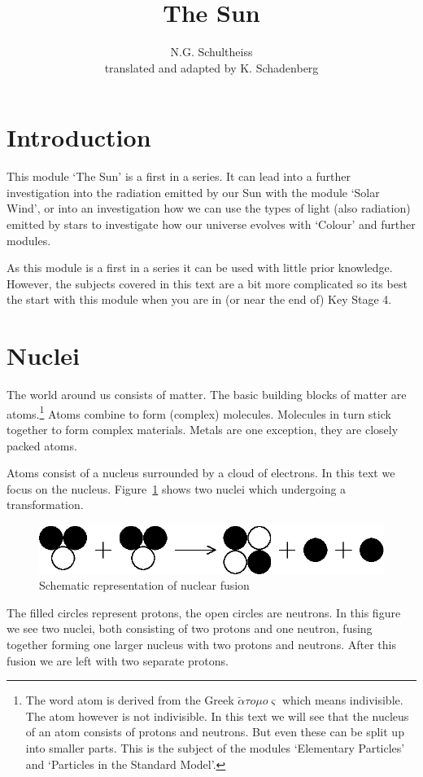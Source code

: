\documentclass[12pt,a4paper]{article}
\author{N.G. Schultheiss \\ translated and adapted by K. Schadenberg}
\date{}
\title{The Sun}
\numberwithin{equation}{section}
\numberwithin{figure}{section}
\numberwithin{table}{section}
\begin{document}
\maketitle

\section{Introduction}
This module `The Sun' is a first in a series. It can lead into a further investigation into the radiation emitted by our Sun with the module `Solar Wind', or into an investigation how we can use the types of light (also radiation) emitted by stars to investigate how our universe evolves with `Colour' and further modules.

As this module is a first in a series it can be used with little prior knowledge. However, the subjects covered in this text are a bit more complicated so its best the start with this module when you are in (or near the end of) Key Stage 4.

\section{Nuclei}
The world around us consists of matter. The basic building blocks of matter are atoms.\footnote{The word atom is derived from the Greek $\breve{\alpha}\tau o \mu o \varsigma$ which means indivisible. The atom however is not indivisible. In this text we will see that the nucleus of an atom consists of protons and neutrons. But even these can be split up into smaller parts. This is the subject of the modules `Elementary Particles' and `Particles in the Standard Model'.} Atoms combine to form (complex) molecules. Molecules in turn stick together to form complex materials. Metals are one exception, they are closely packed atoms.

Atoms consist of a nucleus surrounded by a cloud of electrons. In this text we focus on the nucleus. Figure~\ref{fig:fusion_schem} shows two nuclei which undergoing a transformation.
\begin{figure}\begin{center}
\includegraphics[scale=1]{fusion.eps}%
\caption{Schematic representation of nuclear fusion}\label{fig:fusion_schem}
\end{center}\end{figure}
The filled circles represent protons, the open circles are neutrons. In this figure we see two nuclei, both consisting of two protons and one neutron, fusing together forming one larger nucleus with two protons and neutrons. After this fusion we are left with two separate protons.
\end{document}
